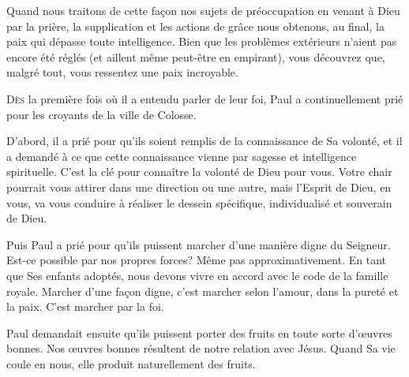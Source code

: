 Quand nous traitons de cette façon nos sujets de préoccupation
 \ocadr en venant à Dieu par la prière, la supplication
 et les actions de grâce \fcadr{}
 nous obtenons, au final, la paix qui dépasse toute intelligence.
 Bien que les problèmes extérieurs n'aient pas encore été réglés
 (et aillent même peut-être en empirant), vous découvrez que, malgré tout,
 vous ressentez une paix incroyable.

\dvrule






\lettrine{D}{ès} la première fois où il a entendu parler de leur foi,
 Paul a continuellement prié pour les croyants de la ville de Colosse. 

D'abord, il a prié pour qu'ils soient remplis de la connaissance
 de Sa volonté, et il a demandé à ce que cette connaissance vienne
 par sagesse et intelligence spirituelle.
 C'est la clé pour connaître la volonté de Dieu pour vous.
 Votre chair pourrait vous attirer dans une direction ou une autre,
 mais l'Esprit de Dieu, en vous, va vous conduire à réaliser
 le dessein spécifique, individualisé et souverain de Dieu.


Puis Paul a prié pour qu'ils puissent marcher d'une manière digne du Seigneur.
 Est-ce possible par nos propres forces? Même pas approximativement.
 En tant que Ses enfants adoptés, nous devons vivre en accord
 avec le code de la famille royale. Marcher d'une façon digne,
 c'est marcher selon l'amour, dans la pureté et la paix.
 C'est marcher par la foi.

Paul demandait ensuite qu'ils puissent porter des fruits en toute sorte
 d'œuvres bonnes. Nos œuvres bonnes résultent de notre relation avec Jésus.
 Quand Sa vie coule en nous, elle produit naturellement des fruits.

